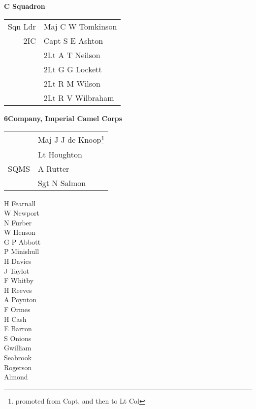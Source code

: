 \vspace*{10mm}

\begin{center}
  \Large
  \textbf{C Squadron}
\end{center}

\begin{center}
  \begin{tabular}{rl}
    Sqn Ldr & Maj C W Tomkinson \\
    2IC & Capt S E Ashton \\
    & 2Lt A T Neilson \\
    & 2Lt G G Lockett \\
    & 2Lt R M Wilson \\
    & 2Lt R V Wilbraham \\
  \end{tabular}
\end{center}

\vspace*{10mm}

\begin{center}
  \Large
  \textbf{6\nth Company, Imperial Camel Corps}
\end{center}

\begin{center}
  \begin{tabular}{rl}
    & Maj J J de Knoop\footnote{promoted from Capt, and then to Lt Col} \\
    & Lt Houghton \\
    SQMS & A Rutter \\
    & Sgt N Salmon \\
  \end{tabular}
\end{center}

\begin{multicols}{3}
  \small
  \noindent
  H Fearnall \\
  W Newport \\
  N Furber \\
  W Henson \\
  G P Abbott \\
  P Minishull \\
  H Davies \\
  J Taylot \\
  F Whitby \\
  H Reeves \\
  A Poynton \\
  F Ormes \\
  H Cash \\
  E Barron \\
  S Onions \\
  Gwilliam \\
  Seabrook \\
  Rogerson \\
  Almond \\
\end{multicols}
